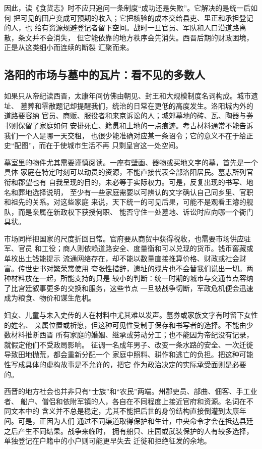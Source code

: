 因此，读《食货志》时不应只追问一条制度“成功还是失败”。它解决的是统一后如何
把可见的田户变成可预期的收入；它把核验的成本交给县吏、里正和承担登记的人，也
给有资源规避登记者留下空间。战时一旦官员、军队和人口沿道路离散，条文并不会消失，
但它能依靠的地方秩序会先消失。西晋后期的财政困境，正是从这类细小而连续的断裂
汇聚而来。

\subsection{洛阳的市场与墓中的瓦片：看不见的多数人}

如果只从帝纪读西晋，太康年间仿佛由朝见、封王和大规模制度名词构成。城市遗址、
墓葬和零散题记却提醒我们，统治的日常在更低的高度发生。洛阳城内外的道路要容纳
官员、商贩、服役者和来京诉讼的人；城郊墓地的砖、瓦、陶器与券书则保留了家庭如何
安排死亡、籍贯和土地的一点痕迹。考古材料通常不能告诉我们一个人是哪一天交租，
也很少能准确对应某一条诏令；它的意义不在于给正史“配图”，而在于使城市生活不再
只剩皇宫这一处空间。

墓室里的物件尤其需要谨慎阅读。一座有壁画、器物或买地文字的墓，首先是一个具体
家庭在特定时刻可以动员的资源，不能直接代表全部洛阳居民。墓志所列官衔和郡望也有
自我呈现的目的，未必等于实际权力。可是，反复出现的书写、地名和葬地选择说明，
至少有一些家庭需要以可辨认的文字确认自己同乡里、官职和祖先的关系。对这些家庭
来说，天下统一的可见后果，可能不是观看王濬的舰队，而是亲属在新政权下获授何职、
能否守住一处墓地、诉讼时应向哪一个衙门具状。

市场同样把国家的尺度折回日常。官府要从商贸中获得税收，也需要市场供应驻军、官员
和工役；商人则依赖道路安全、度量衡和可以兑现的货币。钱币窖藏或单枚出土钱能提示
流通网络存在，却不能以数量直接推算价格、财政或社会财富。传世史书对繁荣常使用
夸张性措辞，遗址的残片也不会替我们说出一切。两种材料放在一起，所能支持的只是
较小的判断：统一时期的城市与交通节点容纳了比宫廷叙事更多的交换和服务，这些节点
一旦被战争切断，军政危机便会迅速成为粮食、物价和谋生危机。

妇女、儿童与未入史传的人在材料中尤其难以发声。墓券或家族文字有时留下女性的姓名、
亲属位置或祈愿，但这种可见性受制于保存和书写者的选择。不能由少数材料推断西晋
所有家庭的婚姻、继承或劳动分工；也不能因为帝纪没有记录，就假定他们不受政局影响。
征调一名成年男子、改变一条水路的安全、一次迁徙导致田地抛荒，都会重新分配一个
家庭中照料、耕作和逃亡的负担。把这种可能性写成具体的虚构故事是不允许的，把它
作为政治决定的实际承受面则是必要的。

西晋的地方社会也并非只有“士族”和“农民”两端。州郡吏员、部曲、佃客、手工业者、
船户、僧侣和依附军镇的人，各自在不同程度上接近官府和资源。名词在不同文本中的
含义并不总是稳定，尤其不能把后世的身份结构直接倒灌到太康年间。可是，正因为人们
通过不同渠道取得保护和生计，中央命令才会在抵达县廷之后产生不同结果。战争来临时，
拥有船只、庄园或武装保护的人有较多选择，单独登记在户籍中的小户则可能更早失去
迁徙和拒绝征发的余地。

